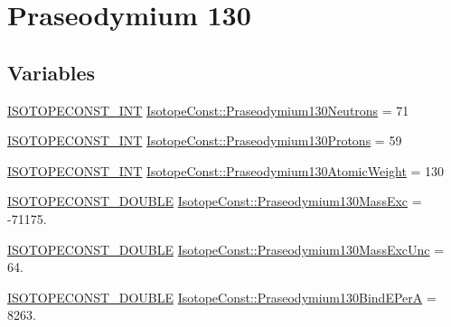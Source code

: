 \hypertarget{group___isotope_const-_praseodymium-_pr130}{}\section{Praseodymium 130}
\label{group___isotope_const-_praseodymium-_pr130}
\subsection*{Variables}
\begin{DoxyCompactItemize}
\item 
\mbox{\hyperlink{group___isotope_const-_macros_ga5f18360b3e99483a35c32d789e62621c}{I\+S\+O\+T\+O\+P\+E\+C\+O\+N\+S\+T\+\_\+\+I\+NT}} \mbox{\hyperlink{group___isotope_const-_praseodymium-_pr130_ga39f9ce239b65d1edc198b3020ad9640b}{Isotope\+Const\+::\+Praseodymium130\+Neutrons}} = 71
\item 
\mbox{\hyperlink{group___isotope_const-_macros_ga5f18360b3e99483a35c32d789e62621c}{I\+S\+O\+T\+O\+P\+E\+C\+O\+N\+S\+T\+\_\+\+I\+NT}} \mbox{\hyperlink{group___isotope_const-_praseodymium-_pr130_gabf88ed142f61f196e0b8f2079a166049}{Isotope\+Const\+::\+Praseodymium130\+Protons}} = 59
\item 
\mbox{\hyperlink{group___isotope_const-_macros_ga5f18360b3e99483a35c32d789e62621c}{I\+S\+O\+T\+O\+P\+E\+C\+O\+N\+S\+T\+\_\+\+I\+NT}} \mbox{\hyperlink{group___isotope_const-_praseodymium-_pr130_ga55f72d8e8ccb86345a1d28e09d85a3bc}{Isotope\+Const\+::\+Praseodymium130\+Atomic\+Weight}} = 130
\item 
\mbox{\hyperlink{group___isotope_const-_macros_ga8f45a7272ce02c0b4c65c44636ed719a}{I\+S\+O\+T\+O\+P\+E\+C\+O\+N\+S\+T\+\_\+\+D\+O\+U\+B\+LE}} \mbox{\hyperlink{group___isotope_const-_praseodymium-_pr130_gaadfa31ec49587660cf81bad0fb9e7371}{Isotope\+Const\+::\+Praseodymium130\+Mass\+Exc}} = -\/71175.
\item 
\mbox{\hyperlink{group___isotope_const-_macros_ga8f45a7272ce02c0b4c65c44636ed719a}{I\+S\+O\+T\+O\+P\+E\+C\+O\+N\+S\+T\+\_\+\+D\+O\+U\+B\+LE}} \mbox{\hyperlink{group___isotope_const-_praseodymium-_pr130_gad1ed256f10cff8b12eebc7b4ffaca3f9}{Isotope\+Const\+::\+Praseodymium130\+Mass\+Exc\+Unc}} = 64.
\item 
\mbox{\hyperlink{group___isotope_const-_macros_ga8f45a7272ce02c0b4c65c44636ed719a}{I\+S\+O\+T\+O\+P\+E\+C\+O\+N\+S\+T\+\_\+\+D\+O\+U\+B\+LE}} \mbox{\hyperlink{group___isotope_const-_praseodymium-_pr130_gaa9226fcb0eb995f440b5b230f6cd5bdf}{Isotope\+Const\+::\+Praseodymium130\+Bind\+E\+PerA}} = 8263.

\end{DoxyCompactItemize}
